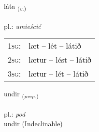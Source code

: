 \documentclass[frontgrid, backgrid]{flacards}\usepackage[]{graphicx}\usepackage[]{xcolor}
\begin{document}
{láta \small{\textsubscript{(\textit{v.})}} \\[1ex] %
\textphonetic{[lauːta]} \\
pl.: \emph{umieścić} \\  [2ex]
\renewcommand*{\arraystretch}{0.8}
\begin{tabular}{p{1cm}l}
\textsc{1sg}: & læt -- lét -- látið \\ 
\textsc{2sg}: & lætur -- lést -- látið \\ 
\textsc{3sg}: & lætur -- lét -- látið \\ 
\end{tabular}
}


\renewcommand{\flhead}{\vskip5pt \fboxsep=0pt {\small\bfseries\footnotesize Forsetning | Preposition}}
\renewcommand{\fcfoot}{\vskip5pt \fboxsep=0pt \hspace{2pt}{\small\bfseries\footnotesize 1K}}

\renewcommand{\blhead}{\vskip5pt {\small\bfseries\footnotesize Forsetning | Preposition }}
\renewcommand{\bcfoot}{\vskip5pt \hspace{2pt}{\small\bfseries\footnotesize 1K}}


{undir \small{\textsubscript{(\textit{prep.})}} \\[1ex]
\textphonetic{[ʏntɪr]} \\
pl.: \emph{pod} \\  [2ex]
undir (Indeclinable)}

\renewcommand{\flhead}{\vskip5pt \fboxsep=0pt {\small\bfseries\footnotesize Sagnorð | Verb}}
\renewcommand{\fcfoot}{\vskip5pt \fboxsep=0pt \hspace{2pt}{\small\bfseries\footnotesize 1K}}

\renewcommand{\blhead}{\vskip5pt {\small\bfseries\footnotesize Sagnorð | Verb }}
\renewcommand{\bcfoot}{\vskip5pt \hspace{2pt}{\small\bfseries\footnotesize 1K}}
\end{document}
